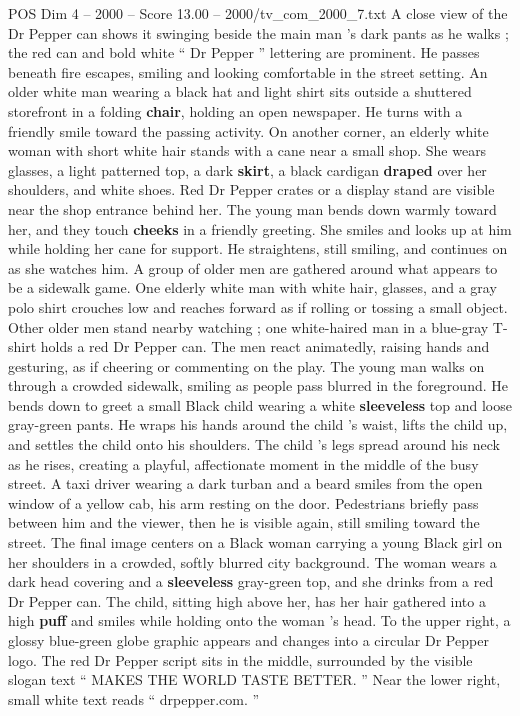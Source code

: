 \begin{textsample}{POS Dim 4 – 2000 – Score 13.00 – 2000/tv\_com\_2000\_7.txt}
A close view of the Dr Pepper can shows it swinging beside the main man ’s dark pants as he walks ; the red can and bold white “ Dr Pepper ” lettering are prominent.
He passes beneath fire escapes, smiling and looking comfortable in the street setting.
An older white man wearing a black hat and light shirt sits outside a shuttered storefront in a folding \textbf{chair}, holding an open newspaper.
He turns with a friendly smile toward the passing activity.
On another corner, an elderly white woman with short white hair stands with a cane near a small shop.
She wears glasses, a light patterned top, a dark \textbf{skirt}, a black cardigan \textbf{draped} over her shoulders, and white shoes.
Red Dr Pepper crates or a display stand are visible near the shop entrance behind her.
The young man bends down warmly toward her, and they touch \textbf{cheeks} in a friendly greeting.
She smiles and looks up at him while holding her cane for support.
He straightens, still smiling, and continues on as she watches him.
A group of older men are gathered around what appears to be a sidewalk game.
One elderly white man with white hair, glasses, and a gray polo shirt crouches low and reaches forward as if rolling or tossing a small object.
Other older men stand nearby watching ; one white-haired man in a blue-gray T-shirt holds a red Dr Pepper can.
The men react animatedly, raising hands and gesturing, as if cheering or commenting on the play.
The young man walks on through a crowded sidewalk, smiling as people pass blurred in the foreground.
He bends down to greet a small Black child wearing a white \textbf{sleeveless} top and loose gray-green pants.
He wraps his hands around the child ’s waist, lifts the child up, and settles the child onto his shoulders.
The child ’s legs spread around his neck as he rises, creating a playful, affectionate moment in the middle of the busy street.
A taxi driver wearing a dark turban and a beard smiles from the open window of a yellow cab, his arm resting on the door.
Pedestrians briefly pass between him and the viewer, then he is visible again, still smiling toward the street.
The final image centers on a Black woman carrying a young Black girl on her shoulders in a crowded, softly blurred city background.
The woman wears a dark head covering and a \textbf{sleeveless} gray-green top, and she drinks from a red Dr Pepper can.
The child, sitting high above her, has her hair gathered into a high \textbf{puff} and smiles while holding onto the woman ’s head.
To the upper right, a glossy blue-green globe graphic appears and changes into a circular Dr Pepper logo.
The red Dr Pepper script sits in the middle, surrounded by the visible slogan text “ MAKES THE WORLD TASTE BETTER. ” Near the lower right, small white text reads “ drpepper.com. ”

\end{textsample}
